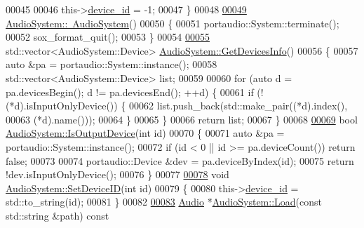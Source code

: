 \begin{DoxyCode}
00045 
00046     this->\hyperlink{classAudioSystem_a3071e6d8643b3d0275ba63820e6e0072}{device\_id} = -1;
00047 \}
00048 
\hypertarget{audio__system_8cpp_source_l00049}{}\hyperlink{classAudioSystem_a9ad830040ea5f68a6a63957c6f281055}{00049} \hyperlink{classAudioSystem_a9ad830040ea5f68a6a63957c6f281055}{AudioSystem::~AudioSystem}()
00050 \{
00051     portaudio::System::terminate();
00052     sox\_format\_quit();
00053 \}
00054 
\hypertarget{audio__system_8cpp_source_l00055}{}\hyperlink{classAudioSystem_aa268faeb9243c18588631024958856e6}{00055} std::vector<AudioSystem::Device> \hyperlink{classAudioSystem_aa268faeb9243c18588631024958856e6}{AudioSystem::GetDevicesInfo}()
00056 \{
00057     \textcolor{keyword}{auto} &pa = portaudio::System::instance();
00058     std::vector<AudioSystem::Device> list;
00059 
00060     \textcolor{keywordflow}{for} (\textcolor{keyword}{auto} d = pa.devicesBegin(); d != pa.devicesEnd(); ++d) \{
00061         \textcolor{keywordflow}{if} (!(*d).isInputOnlyDevice()) \{
00062             list.push\_back(std::make\_pair((*d).index(),
00063                                           (*d).name()));
00064         \}
00065     \}
00066     \textcolor{keywordflow}{return} list;
00067 \}
00068 
\hypertarget{audio__system_8cpp_source_l00069}{}\hyperlink{classAudioSystem_a001cd82f854883b80b3ed7d35795581b}{00069} \textcolor{keywordtype}{bool} \hyperlink{classAudioSystem_a001cd82f854883b80b3ed7d35795581b}{AudioSystem::IsOutputDevice}(\textcolor{keywordtype}{int} \textcolor{keywordtype}{id})
00070 \{
00071     \textcolor{keyword}{auto} &pa = portaudio::System::instance();
00072     \textcolor{keywordflow}{if} (id < 0 || id >= pa.deviceCount()) \textcolor{keywordflow}{return} \textcolor{keyword}{false};
00073 
00074     portaudio::Device &dev = pa.deviceByIndex(\textcolor{keywordtype}{id});
00075     \textcolor{keywordflow}{return} !dev.isInputOnlyDevice();
00076 \}
00077 
\hypertarget{audio__system_8cpp_source_l00078}{}\hyperlink{classAudioSystem_ade3b400828991d02e36a0b61302d30d2}{00078} \textcolor{keywordtype}{void} \hyperlink{classAudioSystem_ade3b400828991d02e36a0b61302d30d2}{AudioSystem::SetDeviceID}(\textcolor{keywordtype}{int} \textcolor{keywordtype}{id})
00079 \{
00080     this->\hyperlink{classAudioSystem_a3071e6d8643b3d0275ba63820e6e0072}{device\_id} = std::to\_string(\textcolor{keywordtype}{id});
00081 \}
00082 
\hypertarget{audio__system_8cpp_source_l00083}{}\hyperlink{classAudioSystem_a2172608177d2bd54377bfc3c61cd117d}{00083} \hyperlink{classAudio}{Audio} *\hyperlink{classAudioSystem_a2172608177d2bd54377bfc3c61cd117d}{AudioSystem::Load}(\textcolor{keyword}{const} std::string &path)\textcolor{keyword}{ const}

\end{DoxyCode}
